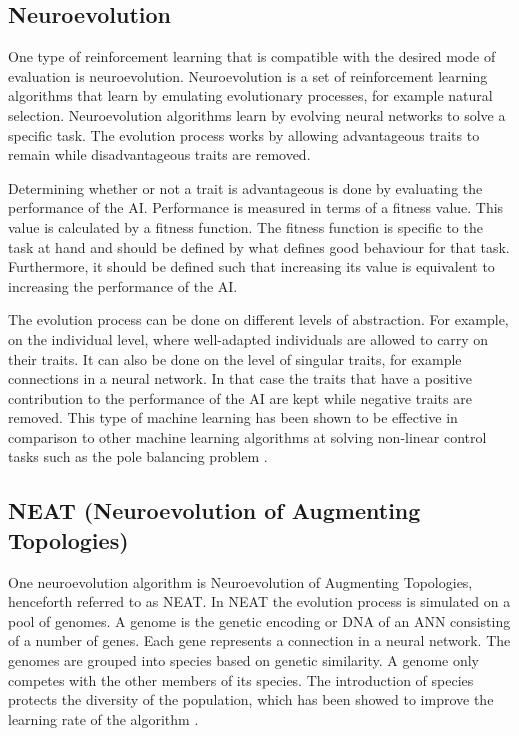 \subsection{Neuroevolution}
\label{section:neuroevolution}
One type of reinforcement learning that is compatible with the desired mode of evaluation is neuroevolution\cite{gomez:CoSyNE}. Neuroevolution is a set of reinforcement learning algorithms that learn by emulating evolutionary processes, for example natural selection. Neuroevolution algorithms learn by evolving neural networks to solve a specific task. The evolution process works by allowing advantageous traits to remain while disadvantageous traits are removed.  

Determining whether or not a trait is advantageous is done by evaluating the performance of the AI. Performance is measured in terms of a fitness value. This value is calculated by a fitness function. The fitness function is specific to the task at hand and should be defined by what defines good behaviour for that task. Furthermore, it should be defined such that increasing its value is equivalent to increasing the performance of the AI.

The evolution process can be done on different levels of abstraction. For example, on the individual level, where well-adapted individuals are allowed to carry on their traits. It can also be done on the level of singular traits, for example connections in a neural network. In that case the traits that have a positive contribution to the performance of the AI are kept while negative traits are removed. This type of machine learning has been shown to be effective in comparison to other machine learning algorithms at solving non-linear control tasks such as the pole balancing problem \cite{gomez:efficient_nonlinear_control}.



\subsection{NEAT (Neuroevolution of Augmenting Topologies)} 
\label{theory:neat}
One neuroevolution algorithm is Neuroevolution of Augmenting Topologies, henceforth referred to as NEAT\cite{ozveren}. In NEAT the evolution process is simulated on a pool of genomes. A genome is the genetic encoding or DNA of an ANN consisting of a number of genes. Each gene represents a connection in a neural network. The genomes are grouped into species based on genetic similarity. A genome only competes with the other members of its species. The introduction of species protects the diversity of the population, which has been showed to improve the learning rate of the algorithm \cite{stanley:neat}.  

